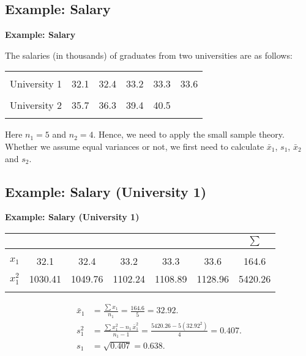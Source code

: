 \documentclass[compress]{beamer}        %
\makeatletter
\newcommand{\tcb}{\textcolor{beamer@blendedblue}}
\makeatother
\begin{document}
\subsection{Example: Salary}
\begin{frame}{\bf \tcb{Example: Salary}}

The salaries (in thousands) of graduates from two universities are as follows:\\
\begin{center}
\begin{tabular}{|c|ccccc|}
\hline
&&&&&\\[-0.4cm]
University 1 & 32.1 & 32.4 & 33.2 & 33.3 & 33.6\\[0.1cm]
\hline
&&&&&\\[-0.4cm]
University 2 & 35.7 & 36.3 & 39.4 & 40.5 &\\[0.1cm]
\hline
\multicolumn{6}{c}{}\\[-0.1cm]
\end{tabular}
\end{center}

Here $n_1 = 5$ and $n_2 = 4$. Hence, we need to apply the small sample theory.\\[0.8cm]

Whether we assume equal variances or not, we first need to calculate $\bar x_1$, $s_1$, $\bar x_2$ and $s_2$.

\end{frame}



\subsection{Example: Salary (University 1)}
\begin{frame}{\bf \tcb{Example: Salary (University 1)}}

\begin{center}
\begin{tabular}{|c|ccccc|c|}
\multicolumn{2}{c}{}&&&& \multicolumn{1}{c}{} & \multicolumn{1}{c}{$\sum$} \\[0.1cm]
\hline
&&&&&&\\[-0.4cm]
$x_1$ & 32.1 & 32.4 & 33.2 & 33.3 & 33.6 & 164.6 \\[0.2cm]
$x_1^2$ & 1030.41 & 1049.76 & 1102.24 & 1108.89 & 1128.96 & 5420.26 \\[0.1cm]
\hline
\multicolumn{7}{c}{}\\[-0.1cm]
\end{tabular}
\end{center}


\begin{align*}
\bar x_1 &= \frac{\sum x_1}{n_1} = \frac{164.6}{5} = 32.92. \\[0.6cm]
s_1^2 &= \frac{\sum x_1^2 - n_1 \, \bar x_1^2 }{n_1-1} = \frac{5420.26 - 5(32.92^2)}{4} = 0.407. \\[0.6cm]
s_1 &= \sqrt{0.407} = 0.638.
\end{align*}


\end{frame}
\end{document}
